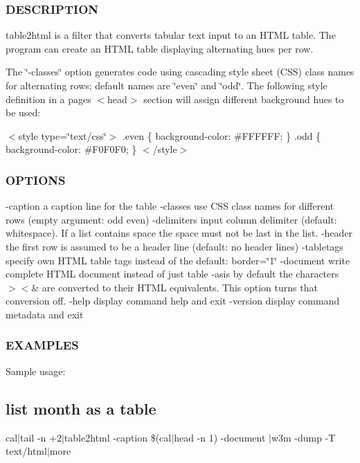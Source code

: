 \subsubsection*{D\+E\+S\+C\+R\+I\+P\+T\+I\+ON}

table2html is a filter that converts tabular text input to an H\+T\+ML table. The program can create an H\+T\+ML table displaying alternating hues per row.

The \char`\"{}-\/classes\char`\"{} option generates code using cascading style sheet (C\+SS) class names for alternating rows; default names are \char`\"{}even\char`\"{} and \char`\"{}odd\char`\"{}. The following style definition in a page\textquotesingle{}s $<$head$>$ section will assign different background hues to be used\+:

$<$style type=\char`\"{}text/css\char`\"{}$>$ .even \{ background-\/color\+: \#\+F\+F\+F\+F\+FF; \} .odd \{ background-\/color\+: \#\+F0\+F0\+F0; \} $<$/style$>$

\subsubsection*{O\+P\+T\+I\+O\+NS}

-\/caption a caption line for the table -\/classes use C\+SS class names for different rows (empty argument\+: odd even) -\/delimiters input column delimiter (default\+: whitespace). If a list contains space the space must not be last in the list. -\/header the first row is assumed to be a header line (default\+: no header lines) -\/tabletags specify own H\+T\+ML table tags instead of the default\+: border=\char`\"{}1\char`\"{} -\/document write complete H\+T\+ML document instead of just table -\/asis by default the characters $>$$<$\& are converted to their H\+T\+ML equivalents. This option turns that conversion off. -\/help display command help and exit -\/version display command metadata and exit \subsubsection*{E\+X\+A\+M\+P\+L\+ES}

Sample usage\+:

\subsection*{list month as a table}

cal$\vert$tail -\/n +2$\vert$table2html -\/caption \$(cal$\vert$head -\/n 1) -\/document $\vert$w3m -\/dump -\/T text/html$\vert$more 

